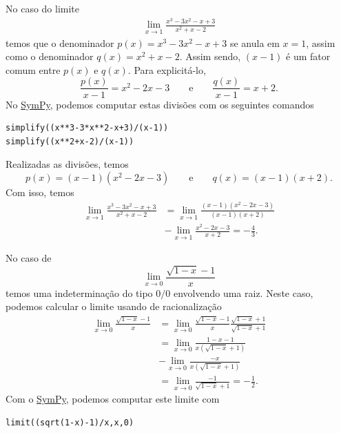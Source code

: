 \begin{ex}
  No caso do limite
  \begin{align}
    \lim_{x\to 1} \frac{x^3-3x^2-x+3}{x^2+x-2}
  \end{align}
  temos que o denominador $p(x) = x^3-3x^2-x+3$ se anula em $x=1$, assim como o denominador $q(x) = x^2+x-2$. Assim sendo, $(x-1)$ é um fator comum entre $p(x)$ e $q(x)$. Para explicitá-lo, 
  \begin{equation}
    \frac{p(x)}{x-1} = x^2-2x-3\qquad\text{e}\qquad\frac{q(x)}{x-1} = x+2.
  \end{equation}
  \ifispython
  No \href{https://www.sympy.org}{SymPy}, podemos computar estas divisões com os seguintes comandos
\begin{verbatim}
simplify((x**3-3*x**2-x+3)/(x-1))
simplify((x**2+x-2)/(x-1))
\end{verbatim}
  \fi
  Realizadas as divisões, temos
  \begin{equation}
    p(x) = (x-1)(x^2-2x-3)\qquad\text{e}\qquad q(x)=(x-1)(x+2).
  \end{equation}
  Com isso, temos
  \begin{align}
    \lim_{x\to 1} \frac{x^3-3x^2-x+3}{x^2+x-2} &= \lim_{x\to 1} \frac{(x-1)(x^2-2x-3)}{(x-1)(x+2)} \\
    &- \lim_{x\to 1} \frac{x^2-2x-3}{x+2} = -\frac{4}{3}.
  \end{align}
\end{ex}

\begin{ex}
  No caso de
  \begin{equation}
    \lim_{x\to 0} \frac{\sqrt{1-x}-1}{x}
  \end{equation}
  temos uma indeterminação do tipo $0/0$ envolvendo uma raiz. Neste caso, podemos calcular o limite usando de racionalização
  \begin{align}
    \lim_{x\to 0} \frac{\sqrt{1-x}-1}{x} &= \lim_{x\to 0} \frac{\sqrt{1-x}-1}{x}\frac{\sqrt{1-x}+1}{\sqrt{1-x}+1}\\
                                         &= \lim_{x\to 0} \frac{1-x-1}{x(\sqrt{1-x}+1)} \\
                                         &- \lim_{x\to 0} \frac{-x}{x(\sqrt{1-x}+1)}\\
    &= \lim_{x\to 0} \frac{-1}{\sqrt{1-x}+1} = -\frac{1}{2}.
  \end{align}
  \ifispython
  Com o \href{https://www.sympy.org}{SymPy}, podemos computar este limite com
\begin{verbatim}
limit((sqrt(1-x)-1)/x,x,0)
\end{verbatim}
  \fi
\end{ex}

